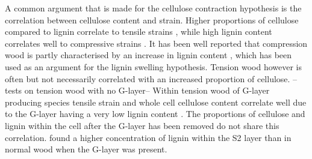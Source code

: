 A common argument that is made for the cellulose contraction hypothesis is the
correlation between cellulose content and strain. Higher proportions of
cellulose compared to lignin correlate to tensile strains \cite{Sugiyama_1993}\cite{Qiu_2008}\cite{Yang_2006}, while high lignin
content correlates well to compressive strains \cite{ISI:A1991FD97000001}\cite{Okuyama_1998}. It has been well
reported that compression wood is partly characterised by an increase in
lignin content \cite{timell1986compression}, which has been used as an argument for the lignin
swelling hypothesis. Tension wood however is often but not necessarily
correlated with an increased proportion of cellulose. --tests on tension wood
with no G-layer-- Within tension wood of G-layer producing species tensile
strain and whole cell cellulose content correlate well due to the G-layer
having a very low lignin content \cite{gardiner2014biology}. The proportions of cellulose and lignin
within the cell after the G-layer has been removed do not share this correlation. \cite{timell1969chemical} found a higher concentration of lignin within the S2 layer than in normal wood when the G-layer was present. 
